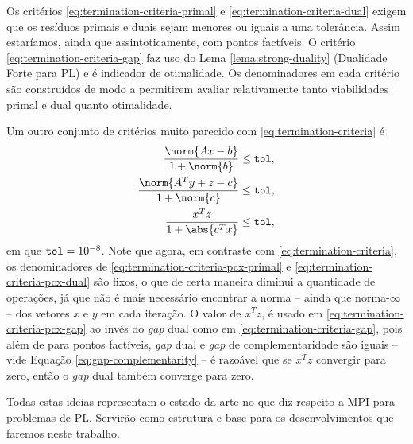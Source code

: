 Os critérios
\eqref{eq:termination-criteria-primal} e \eqref{eq:termination-criteria-dual}
exigem que os resíduos primais e duais sejam menores ou iguais a uma tolerância.
Assim estaríamos, ainda que assintoticamente, com pontos factíveis. O critério
\eqref{eq:termination-criteria-gap} faz uso do Lema
\ref{lema:strong-duality} (Dualidade Forte para \ac{PL}) e é indicador de
otimalidade. Os denominadores em cada critério são construídos de modo a 
permitirem avaliar relativamente tanto viabilidades primal e dual quanto
otimalidade.
  
Um outro conjunto de critérios muito parecido  com
\eqref{eq:termination-criteria}  é
\begin{subequations}
\label{eq:termination-criteria-pcx}
\begin{align}
	\dfrac{\norm{Ax - b}}{1 + \norm{b}} \leq \tol,
	\label{eq:termination-criteria-pcx-primal}\\
	\dfrac{\norm{A^Ty + z - c}}{1 + \norm{c}} \leq \tol,
	\label{eq:termination-criteria-pcx-dual}\\
	\dfrac{x^{T}z}{1 + \abs{c^Tx}}\leq
	\tol,\label{eq:termination-criteria-pcx-gap}
\end{align}
\end{subequations}
em que $\mathtt{tol} = 10^{-8}$. Note que agora, em contraste com
\eqref{eq:termination-criteria}, os denominadores de 
\eqref{eq:termination-criteria-pcx-primal} e
\eqref{eq:termination-criteria-pcx-dual} são fixos, o que de certa maneira
diminui a quantidade de operações, já que não é mais necessário encontrar a
norma  -- ainda que norma-$\infty$ --  dos vetores $x$ e $y$ em cada
iteração. O valor de $x^{T}z$,  é usado em \eqref{eq:termination-criteria-pcx-gap} ao
 invés do \emph{gap} dual  como em \eqref{eq:termination-criteria-gap}, pois além de para pontos factíveis, \emph{gap} dual e \emph{gap} de complementaridade são iguais -- vide Equação \eqref{eq:gap-complementarity} -- é razoável que se $x^{T}z$ convergir para zero, então o \emph{gap} dual também converge para zero.




Todas estas ideias representam o estado da arte no que diz respeito a \ac{MPI}
para problemas de \ac{PL}. Servirão como estrutura e base para os
desenvolvimentos que faremos neste trabalho.
